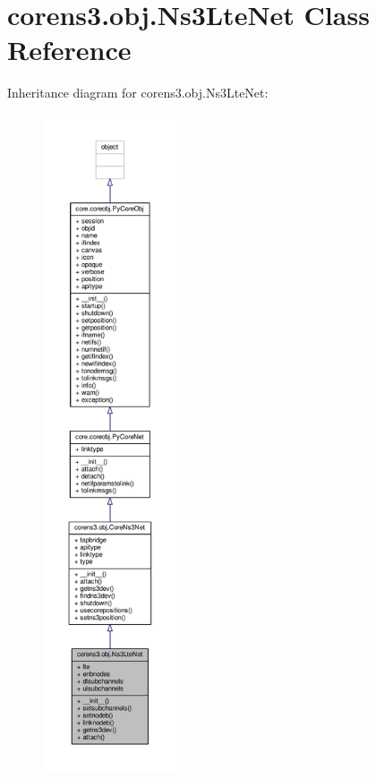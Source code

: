 \hypertarget{classcorens3_1_1obj_1_1_ns3_lte_net}{\section{corens3.\+obj.\+Ns3\+Lte\+Net Class Reference}
\label{classcorens3_1_1obj_1_1_ns3_lte_net}
}


Inheritance diagram for corens3.\+obj.\+Ns3\+Lte\+Net\+:
\nopagebreak
\begin{figure}[H]
\begin{center}
\leavevmode
\includegraphics[height=550pt]{classcorens3_1_1obj_1_1_ns3_lte_net__inherit__graph}
\end{center}
\end{figure}


